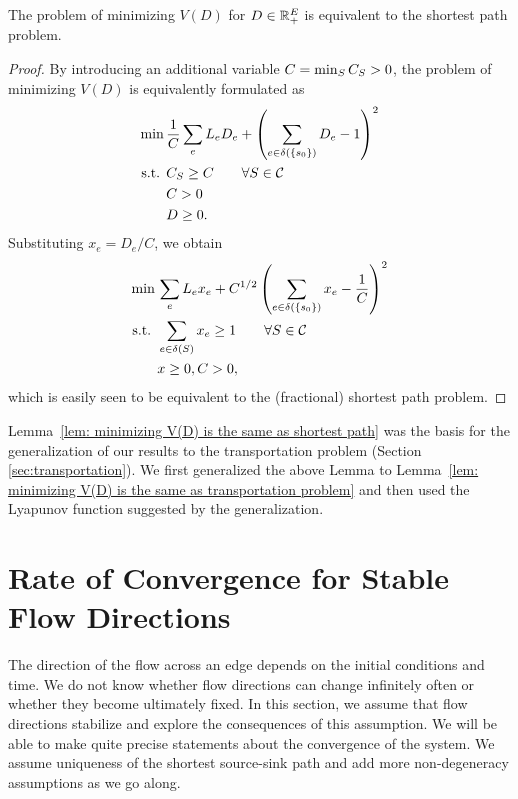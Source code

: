 \documentclass[11pt,a4paper]{article}
\renewcommand{\source}{\ensuremath{s_0}}
\begin{document}
\begin{lemma}\label{lem: minimizing V(D) is the same as shortest path}
The problem of minimizing $V(D)$ for $D \in \mathbb{R}^E_+$ is equivalent to the shortest path problem. 
\end{lemma}
\begin{proof}
By introducing an additional variable $C = \min_{S} \capa(S) > 0$, the problem of minimizing $V(D)$ is equivalently formulated as
\begin{align*}
\min\, & \frac{1}{C} \sum_e L_e D_e + \left(\sum_{e \in \delta(\{\source\})} D_e - 1 \right)^2 \\
\text{s.t. } & \capa(S) \ge C \qquad \forall S \in \calC \\
& C>0 \\
& D \ge 0. 
\end{align*}
Substituting $x_e = D_e / C$, we obtain
\begin{align*}
\min\, & \sum_e L_e x_e  + C^{1/2} \left(\sum_{e \in \delta(\{\source\})} x_e - \frac{1}{C} \right)^2 \\
\text{s.t. } & \sum_{e \in \delta(S)} x_e \ge 1 \qquad \forall S \in \calC \\
& x \ge 0, C > 0,
\end{align*}
which is easily seen to be equivalent to the (fractional) shortest path problem. 
\end{proof}

Lemma~\ref{lem: minimizing V(D) is the same as shortest path} was the basis for
the generalization of our results to the transportation problem (Section \ref{sec:transportation}). We first
generalized the above Lemma to Lemma~\ref{lem: minimizing V(D) is the same as
transportation problem} and then used the Lyapunov function suggested by the
generalization.


\section{Rate of Convergence for Stable Flow Directions}\label{sec: stable flow
directions}

The direction of the flow across an edge depends on the initial conditions and
time. We do not know whether flow directions can change infinitely
often or whether they become ultimately fixed. 
In this section, we assume that flow directions stabilize and explore the
consequences of this assumption. We will be able to make quite precise
statements about the convergence of the system. We assume
uniqueness of the shortest source-sink path and add more non-degeneracy
assumptions as we go along. 
\end{document}
